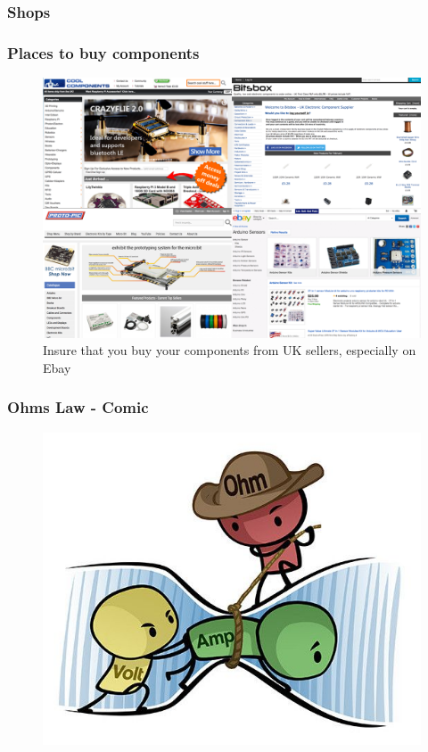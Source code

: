 



\begin{frame}
	\frametitle{Shops}
	\frametitle{Places to buy components}
	\begin{figure}
		\includegraphics[scale=.25]{assets/shops} 
		\caption{Insure that you buy your components from UK sellers, especially on Ebay}
	\end{figure}
\end{frame}

\begin{frame}
 	\frametitle{Ohms Law - Comic}
   	\begin{figure}
   		\includegraphics[scale=.3]{assets/ohm} 
	\end{figure}
\end{frame}

